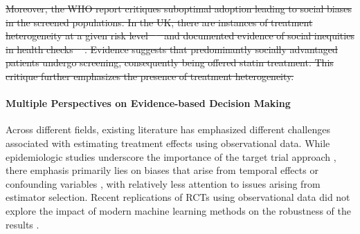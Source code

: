 \documentclass[10pt,letterpaper]{article}
\providecommand{\DIFdeltex}[1]{{\protect\color{red}\sout{#1}}}                      %
\providecommand{\DIFdelbegin}{} %
\providecommand{\DIFdelend}{} %
\providecommand{\DIFdel}[1]{\texorpdfstring{\DIFdeltex{#1}}{}} %
\newcommand{\DIFscaledelfig}{0.5}
\newlength{\DIFdelgraphicswidth} %
\newlength{\DIFdelgraphicsheight} %
\newcommand{\DIFdelincludegraphics}[2][]{%
\sbox{\DIFdelgraphicsbox}{\DIFOincludegraphics[#1]{#2}}%
\settoboxwidth{\DIFdelgraphicswidth}{\DIFdelgraphicsbox} %
\settoboxtotalheight{\DIFdelgraphicsheight}{\DIFdelgraphicsbox} %
\scalebox{\DIFscaledelfig}{%
\parbox[b]{\DIFdelgraphicswidth}{\usebox{\DIFdelgraphicsbox}\\[-\baselineskip] \rule{\DIFdelgraphicswidth}{0em}}\llap{\resizebox{\DIFdelgraphicswidth}{\DIFdelgraphicsheight}{%
\setlength{\unitlength}{\DIFdelgraphicswidth}%
\begin{picture}(1,1)%
\thicklines\linethickness{2pt} %
{\color[rgb]{1,0,0}\put(0,0){\framebox(1,1){}}}%
{\color[rgb]{1,0,0}\put(0,0){\line( 1,1){1}}}%
{\color[rgb]{1,0,0}\put(0,1){\line(1,-1){1}}}%
\end{picture}%
}\hspace*{3pt}}} %
} %
\DeclareRobustCommand{\DIFdelbegin}{\DIFOdelbegin \let\includegraphics\DIFdelincludegraphics} %
\DeclareRobustCommand{\DIFdelend}{\DIFOaddend \let\includegraphics\DIFOincludegraphics} %
\begin{document}
\DIFdelbegin \DIFdel{Moreover, the WHO report critiques suboptimal adoption leading to social biases in the screened populations. In the UK, there are instances of treatment heterogeneity at a given risk level \mbox{%
    \cite{van2013efficiency} }\hskip0pt%
  and documented evidence of social inequities in health checks \mbox{%
    \cite{krska2016implementation}}\hskip0pt%
  . Evidence suggests that predominantly socially advantaged patients undergo screening, consequently being offered statin treatment. This critique further emphasizes the presence of treatment heterogeneity.
}\DIFdelend %

\paragraph{Multiple Perspectives on Evidence-based Decision Making}
Across different fields, existing literature has emphasized different challenges associated
with estimating treatment effects using observational data. While epidemiologic
studies underscore the importance of the target trial approach
\cite{von2007strengthening,benchimol2015reporting,hernan2020causal,schneeweiss2021conducting,zeng2022uncovering},
there emphasis primarily lies on biases that arise from temporal effects \cite{suissa2008immortal,Oke2021leadtimebias,fu2021timing,hernan2016specifying,wang2022understanding,Bankhead2017attritionbias} or confounding variables \cite{greenland1999causal,vanderweele2019principles,loh2021confounder}, with
relatively less attention to issues arising from estimator selection.
Recent replications of RCTs using observational data did not explore the impact
of modern machine learning methods on the robustness of the results
\cite{schneeweiss2021conducting,wang2023emulation}.
\end{document}
